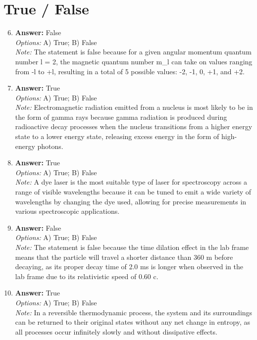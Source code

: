 \documentclass[12pt]{article}
\begin{document}
\section*{True / False}
\begin{enumerate}[label=\arabic*.]
\setcounter{enumi}{5}
\item \textbf{Answer:} False
\\ \textit{Options:} A) True; B) False
\\ \textit{Note:} The statement is false because for a given angular momentum quantum number l = 2, the magnetic quantum number m\_l can take on values ranging from -l to +l, resulting in a total of 5 possible values: -2, -1, 0, +1, and +2.
\item \textbf{Answer:} True
\\ \textit{Options:} A) True; B) False
\\ \textit{Note:} Electromagnetic radiation emitted from a nucleus is most likely to be in the form of gamma rays because gamma radiation is produced during radioactive decay processes when the nucleus transitions from a higher energy state to a lower energy state, releasing excess energy in the form of high-energy photons.
\item \textbf{Answer:} True
\\ \textit{Options:} A) True; B) False
\\ \textit{Note:} A dye laser is the most suitable type of laser for spectroscopy across a range of visible wavelengths because it can be tuned to emit a wide variety of wavelengths by changing the dye used, allowing for precise measurements in various spectroscopic applications.
\item \textbf{Answer:} False
\\ \textit{Options:} A) True; B) False
\\ \textit{Note:} The statement is false because the time dilation effect in the lab frame means that the particle will travel a shorter distance than 360 m before decaying, as its proper decay time of 2.0 ms is longer when observed in the lab frame due to its relativistic speed of 0.60 c.
\item \textbf{Answer:} True
\\ \textit{Options:} A) True; B) False
\\ \textit{Note:} In a reversible thermodynamic process, the system and its surroundings can be returned to their original states without any net change in entropy, as all processes occur infinitely slowly and without dissipative effects.
\end{enumerate}
\end{document}
